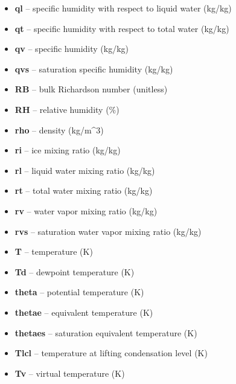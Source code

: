 \documentclass[letterpaper,10pt,english]{sphinxmanual}
\begin{document}
\begin{fulllineitems}
\begin{itemize}
\item {} 
\textbf{ql} -- specific humidity with respect to liquid water (kg/kg)

\item {} 
\textbf{qt} -- specific humidity with respect to total water (kg/kg)

\item {} 
\textbf{qv} -- specific humidity (kg/kg)

\item {} 
\textbf{qvs} -- saturation specific humidity (kg/kg)

\item {} 
\textbf{RB} -- bulk Richardson number (unitless)

\item {} 
\textbf{RH} -- relative humidity (\%)

\item {} 
\textbf{rho} -- density (kg/m\textasciicircum{}3)

\item {} 
\textbf{ri} -- ice mixing ratio (kg/kg)

\item {} 
\textbf{rl} -- liquid water mixing ratio (kg/kg)

\item {} 
\textbf{rt} -- total water mixing ratio (kg/kg)

\item {} 
\textbf{rv} -- water vapor mixing ratio (kg/kg)

\item {} 
\textbf{rvs} -- saturation water vapor mixing ratio (kg/kg)

\item {} 
\textbf{T} -- temperature (K)

\item {} 
\textbf{Td} -- dewpoint temperature (K)

\item {} 
\textbf{theta} -- potential temperature (K)

\item {} 
\textbf{thetae} -- equivalent temperature (K)

\item {} 
\textbf{thetaes} -- saturation equivalent temperature (K)

\item {} 
\textbf{Tlcl} -- temperature at lifting condensation level (K)

\item {} 
\textbf{Tv} -- virtual temperature (K)


\end{itemize}
\end{fulllineitems}
\end{document}
